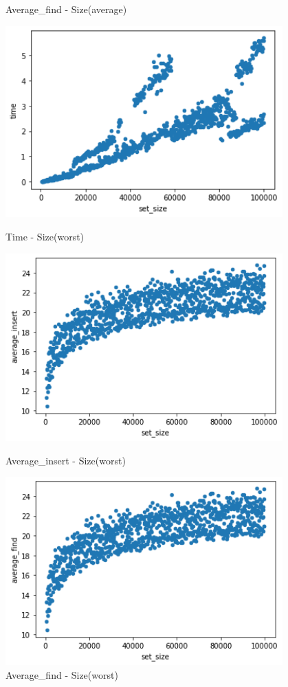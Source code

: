 \documentclass[a4]{article}
\begin{document}
\begin{figure}[H]
\begin{minipage}{0.5\textwidth}
    \caption{Average\_find - Size(average)}
    \end{minipage}
    \begin{minipage}{0.5\textwidth}
    \includegraphics[width=0.95\textwidth]{bstree4.png}
    \caption{Time - Size(worst)}
    \end{minipage}
    \begin{minipage}{0.5\textwidth}        
    \includegraphics[width=0.95\textwidth]{bstree5.png}
    \caption{Average\_insert - Size(worst)}
    \end{minipage}
    \begin{minipage}{0.5\textwidth}        
    \includegraphics[width=0.95\textwidth]{bstree6.png}
    \caption{Average\_find - Size(worst)}
    \end{minipage}
\end{figure}
\end{document}
